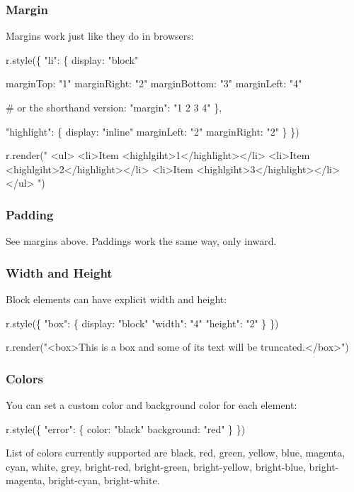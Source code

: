 \subsubsection*{Margin}

Margins work just like they do in browsers\+: 
\begin{DoxyCode}
r.style(\{
  "li": \{
    display: "block"

    marginTop: "1"
    marginRight: "2"
    marginBottom: "3"
    marginLeft: "4"

    # or the shorthand version:
    "margin": "1 2 3 4"
  \},

  "highlight": \{
    display: "inline"
    marginLeft: "2"
    marginRight: "2"
  \}
\})

r.render("
<ul>
  <li>Item <highlgiht>1</highlight></li>
  <li>Item <highlgiht>2</highlight></li>
  <li>Item <highlgiht>3</highlight></li>
</ul>
")
\end{DoxyCode}


\subsubsection*{Padding}

See margins above. Paddings work the same way, only inward.

\subsubsection*{Width and Height}

Block elements can have explicit width and height\+: 
\begin{DoxyCode}
r.style(\{
  "box": \{
    display: "block"
    "width": "4"
    "height": "2"
  \}
\})

r.render("<box>This is a box and some of its text will be truncated.</box>")
\end{DoxyCode}


\subsubsection*{Colors}

You can set a custom color and background color for each element\+:


\begin{DoxyCode}
r.style(\{
  "error": \{
    color: "black"
    background: "red"
  \}
\})
\end{DoxyCode}


List of colors currently supported are {\ttfamily black}, {\ttfamily red}, {\ttfamily green}, {\ttfamily yellow}, {\ttfamily blue}, {\ttfamily magenta}, {\ttfamily cyan}, {\ttfamily white}, {\ttfamily grey}, {\ttfamily bright-\/red}, {\ttfamily bright-\/green}, {\ttfamily bright-\/yellow}, {\ttfamily bright-\/blue}, {\ttfamily bright-\/magenta}, {\ttfamily bright-\/cyan}, {\ttfamily bright-\/white}.

